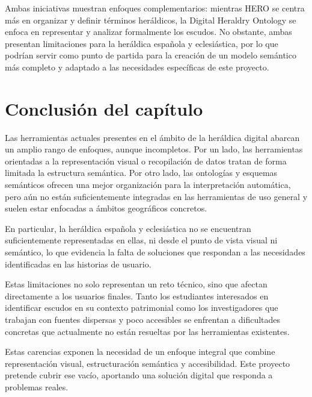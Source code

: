 Ambas iniciativas muestran enfoques complementarios: mientras HERO se centra más en organizar y
definir términos heráldicos, la Digital Heraldry Ontology se enfoca en representar y analizar
formalmente los escudos. No obstante, ambas presentan limitaciones para la heráldica española y
eclesiástica, por lo que podrían servir como punto de partida para la creación de un modelo semántico
más completo y adaptado a las necesidades específicas de este proyecto.

\section{Conclusión del capítulo}
Las herramientas actuales presentes en el ámbito de la heráldica digital abarcan un amplio
rango de enfoques, aunque incompletos. Por un lado, las herramientas orientadas a la representación
visual o recopilación de datos tratan de forma limitada la estructura semántica. Por otro lado,
las ontologías y esquemas semánticos ofrecen una mejor organización para la interpretación
automática, pero aún no están suficientemente integradas en las herramientas de uso general y
suelen estar enfocadas a ámbitos geográficos concretos. 

En particular, la heráldica española y eclesiástica no se encuentran suficientemente representadas 
en ellas, ni desde el punto de vista visual ni semántico, lo que evidencia la falta de soluciones 
que respondan a las necesidades identificadas en las historias de usuario.

Estas limitaciones no solo representan un reto técnico, sino que afectan directamente a los 
usuarios finales. Tanto los estudiantes interesados en identificar escudos en su contexto patrimonial 
como los investigadores que trabajan con fuentes dispersas y poco accesibles se enfrentan a 
dificultades concretas que actualmente no están resueltas por las herramientas existentes.

Estas carencias exponen la necesidad de un enfoque integral que combine representación
visual, estructuración semántica y accesibilidad. Este proyecto pretende cubrir ese vacío,
aportando una solución digital que responda a problemas reales.